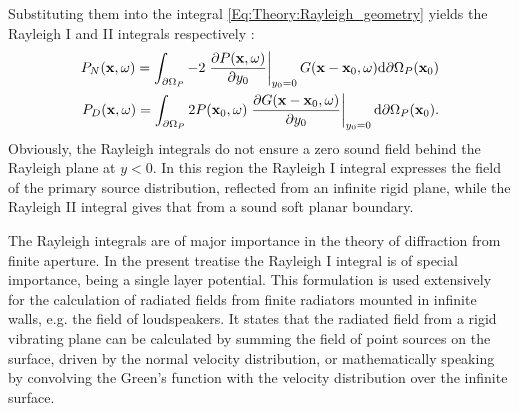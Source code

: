 Substituting them into the integral \eqref{Eq:Theory:Rayleigh_geometry} yields the Rayleigh I and II integrals respectively \cite{Berkhout1984}:
\begin{eqnarray}
P_N(\mathbf{x},\omega) =
\int_{\partial \Omega_P}
-2
\left. \frac{\partial P(\mathbf{x},\omega)}{\partial y_0} \right|_{y_0 = 0} 
G(\mathbf{x}-\mathbf{x}_0,\omega) \mathrm{d} \partial \Omega_P ( \mathbf{x}_0)
\label{Eq:Theory:RayleighI}
\\
P_D(\mathbf{x},\omega) =
\int_{\partial \Omega_P}
2 P(\mathbf{x}_0,\omega)  
\left. \frac{\partial G(\mathbf{x}-\mathbf{x}_0,\omega)}{\partial y_0} \right|_{y_0 = 0} 
\mathrm{d} \partial \Omega_P ( \mathbf{x}_0).
\label{Eq:Theory:RayleighII}
\end{eqnarray}
Obviously, the Rayleigh integrals do not ensure a zero sound field behind the Rayleigh plane at $y<0$.
In this region the Rayleigh I integral expresses the field of the primary source distribution, reflected from an infinite rigid plane, while the Rayleigh II integral gives that from a sound soft planar boundary.

The Rayleigh integrals are of major importance in the theory of diffraction from finite aperture.
In the present treatise the Rayleigh I integral is of special importance, being a single layer potential.
This formulation is used extensively for the calculation of radiated fields from finite radiators mounted in infinite walls, e.g. the field of loudspeakers.
It states that the radiated field from a rigid vibrating plane can be calculated by summing the field of point sources on the surface, driven by the normal velocity distribution, or mathematically speaking by convolving the Green's function with the velocity distribution over the infinite surface.


